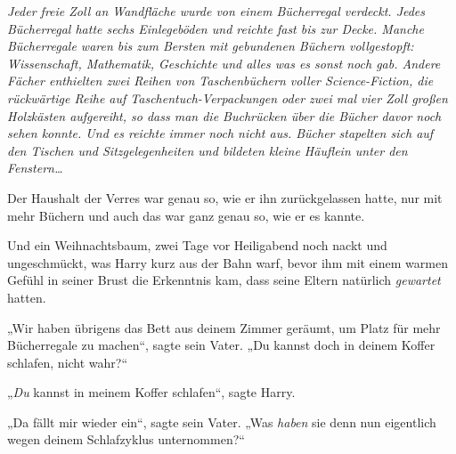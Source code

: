 \emph{Jeder freie Zoll an Wandfläche wurde von einem Bücherregal verdeckt. Jedes Bücherregal hatte sechs Einlegeböden und reichte fast bis zur Decke. Manche Bücherregale waren bis zum Bersten mit gebundenen Büchern vollgestopft: Wissenschaft, Mathematik, Geschichte und alles was es sonst noch gab. Andere Fächer enthielten zwei Reihen von Taschenbüchern voller Science-Fiction, die rückwärtige Reihe auf Taschentuch-Verpackungen oder zwei mal vier Zoll großen Holzkästen aufgereiht, so dass man die Buchrücken über die Bücher davor noch sehen konnte. Und es reichte immer noch nicht aus. Bücher stapelten sich auf den Tischen und Sitzgelegenheiten und bildeten kleine Häuflein unter den Fenstern…}

Der Haushalt der Verres war genau so, wie er ihn zurückgelassen hatte, nur mit mehr Büchern und auch das war ganz genau so, wie er es kannte.

Und ein Weihnachtsbaum, zwei Tage vor Heiligabend noch nackt und ungeschmückt, was Harry kurz aus der Bahn warf, bevor ihm mit einem warmen Gefühl in seiner Brust die Erkenntnis kam, dass seine Eltern natürlich \emph{gewartet} hatten.

„Wir haben übrigens das Bett aus deinem Zimmer geräumt, um Platz für mehr Bücherregale zu machen“, sagte sein Vater. „Du kannst doch in deinem Koffer schlafen, nicht wahr?“

„\emph{Du} kannst in meinem Koffer schlafen“, sagte Harry.

„Da fällt mir wieder ein“, sagte sein Vater. „Was \emph{haben} sie denn nun eigentlich wegen deinem Schlafzyklus unternommen?“


